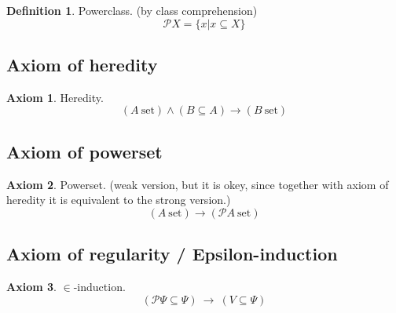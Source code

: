 \documentclass[10pt,a4paper]{article}
\theoremstyle{definition}
\newtheorem{axiom}{Axiom}
\newtheorem{definition}{Definition}[section]
\renewcommand{\implies}{\ \longrightarrow\ }
\newcommand{\power}{\mathcal{P}}
\newcommand{\set}{\mathrm{\ set}}
\begin{document}
\begin{definition} Powerclass. (by class comprehension)
\[
\power X = \{x|x\subseteq X\}
\]
\end{definition}
\subsection{Axiom of heredity}
\begin{axiom}
\label{axm:heredity}
Heredity.
\[
(A\set) \land (B\subseteq A) \rightarrow (B\set)
\]
\end{axiom}
\subsection{Axiom of powerset}
\begin{axiom}
\label{axm:powerset}
Powerset. (weak version, but it is okey, since together with axiom of heredity it is equivalent to the strong version.)
\[(A\set) \rightarrow (\power A\set)\]
\end{axiom}

\subsection{Axiom of regularity / Epsilon-induction}
\begin{axiom} 
\label{axn:epsilon induction}
$\in$-induction. %
\[
(\power\Psi\subseteq\Psi)\implies(V\subseteq\Psi)
\]
\end{axiom}

\end{document}

